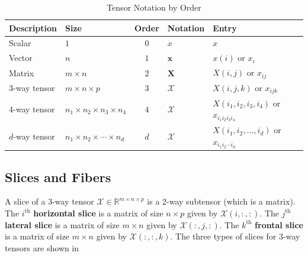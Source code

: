     \begin{table}[ht!]
        \centering
        \renewcommand{\arraystretch}{0.5}
        \begin{tabular}{@{}llcll@{}}
        \toprule
        \textbf{Description} & \textbf{Size} & \textbf{Order} & \textbf{Notation} & \textbf{Entry} \\ 
        \midrule
        Scalar         & $1$                         & $0$ & $x$        & $x$ \\
        Vector         & $n$                         & $1$ & $\mathbf{x}$        & $x(i)$ or $x_i$ \\
        Matrix         & $m \times n$                & $2$ & $\mathbf{X}$        & $X(i,j)$ or $x_{ij}$ \\
        3-way tensor   & $m \times n \times p$       & $3$ & $\mathcal{X}$       & $X(i,j,k)$ or $x_{ijk}$ \\
        4-way tensor   & $n_1 \times n_2 \times n_3 \times n_4$ & $4$ & $\mathcal{X}$ & $X(i_1,i_2,i_3,i_4)$ or $x_{i_1i_2i_3i_4}$ \\
        $d$-way tensor & $n_1 \times n_2 \times \cdots \times n_d$ & $d$ & $\mathcal{X}$ & $X(i_1, i_2, \dots, i_d)$ or $x_{i_1i_2\cdots i_d}$ \\
        \bottomrule
        \end{tabular}
        \caption{Tensor Notation by Order}
        \label{tab:tensor_notation}
    \end{table}

\subsection{Slices and Fibers} \label{sec:Slices and Fibers}
    A slice of a 3-way tensor $\mathcal{X}\in\mathbb{R}^{m\times n\times p}$ is
    a 2-way subtensor (which is a matrix). The $i^\text{th}$ \textbf{horizontal
    slice} is a matrix of size $n \times p$ given by $\mathcal{X}(i, :, :)$. The
    $j^\text{th}$ \textbf{lateral slice} is a matrix of size $m\times n$ given
    by $\mathcal{X}(:, j, :)$. The $k^\text{th}$ \textbf{frontal slice} is a
    matrix of size $m\times n$ given by $\mathcal{X}(:, :, k)$. The three types
    of slices for 3-way tensors are shown in 

